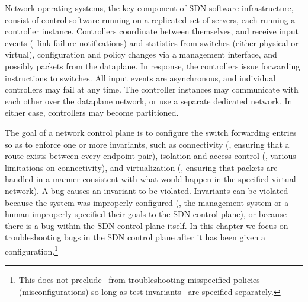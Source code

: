 %
Network operating systems, the key component of SDN software
infrastructure, consist of control software running on a replicated set of
servers, each running a controller instance. Controllers coordinate between
themselves, and receive input events (\eg~link failure notifications) and
statistics from switches (either physical or virtual), configuration and
policy changes via a management interface, and possibly packets from the dataplane.
In response, the
controllers issue forwarding instructions to switches. All input
events are asynchronous, and individual controllers may fail at any
time. The controller instances may communicate
with each other over the dataplane network, or use a separate dedicated
network. In either case, controllers may become partitioned.

The goal of a network control plane is to configure the switch forwarding entries so as to
enforce one or more invariants, such as connectivity (\ie, ensuring that a
route exists between every endpoint pair), isolation and access control (\ie, various limitations on
connectivity), and virtualization (\ie, ensuring that packets are handled
in a manner consistent with what would happen in the specified virtual
network). A bug causes an invariant to be violated. Invariants can be
violated because the system was improperly configured
(\eg, the management system \cite{quantum} or a human improperly specified their goals to the SDN control plane), or
because there is a bug within the SDN control plane itself. In this chapter we focus on troubleshooting bugs in the
SDN control plane after it has been given a configuration.\footnote{This does
not preclude \projectname~from troubleshooting misspecified policies
(misconfigurations) so long as
test invariants~\cite{hsa} are specified separately.}

